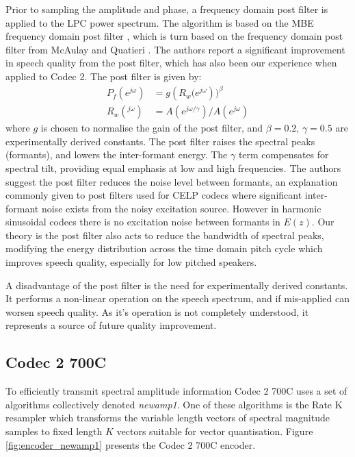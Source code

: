\documentclass{article}
\begin{document}
{Prior to sampling the amplitude and phase, a frequency domain post filter is applied to the LPC power spectrum. The algorithm is based on the MBE frequency domain post filter \cite[Section 8.6, p 267]{kondoz1994digital}, which is turn based on the frequency domain post filter from McAulay and Quatieri \cite[Section 4.3, p 148]{kleijn1995speech}.  The authors report a significant improvement in speech quality from the post filter, which has also been our experience when applied to Codec 2. The post filter is given by:
\begin{equation}
\label{eq:lpc_lsp_pf}
\begin{split}
P_f(e^{j\omega}) &= g \left( R_w(e^{j \omega} \right))^\beta \\
R_w(^{j\omega}) &= A(e^{j \omega/ \gamma})/A(e^{j \omega})
\end{split}
\end{equation}
where $g$ is chosen to normalise the gain of the post filter, and $\beta=0.2$, $\gamma=0.5$ are experimentally derived constants.  The post filter raises the spectral peaks (formants), and lowers the inter-formant energy.  The $\gamma$ term compensates for spectral tilt, providing equal emphasis at low and high frequencies.  The authors suggest the post filter reduces the noise level between formants, an explanation commonly given to post filters used for CELP codecs where significant inter-formant noise exists from the noisy excitation source.  However in harmonic sinusoidal codecs there is no excitation noise between formants in $E(z)$.  Our theory is the post filter also acts to reduce the bandwidth of spectral peaks, modifying the energy distribution across the time domain pitch cycle which improves speech quality, especially for low pitched speakers.

A disadvantage of the post filter is the need for experimentally derived constants.  It performs a non-linear operation on the speech spectrum, and if mis-applied can worsen speech quality.  As it's operation is not completely understood, it represents a source of future quality improvement.

\subsection{Codec 2 700C}
\label{sect:mode_newamp1}

To efficiently transmit spectral amplitude information Codec 2 700C uses a set of algorithms collectively denoted \emph{newamp1}.  One of these algorithms is the Rate K resampler which transforms the variable length vectors of spectral magnitude samples to fixed length $K$ vectors suitable for vector quantisation. Figure \ref{fig:encoder_newamp1} presents the Codec 2 700C encoder.  

}
\end{document}
